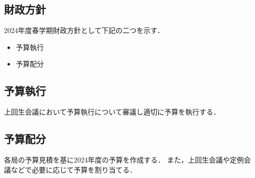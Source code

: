 \subsection*{財政方針}


2024年度春学期財政方針として下記の二つを示す．
\begin{itemize}
    \item 予算執行
    \item 予算配分
\end{itemize}

\subsection*{予算執行}
上回生会議において予算執行について審議し適切に予算を執行する．

\subsection*{予算配分}
各局の予算見積を基に2024年度の予算を作成する．
また，上回生会議や定例会議などで必要に応じて予算を割り当てる．
